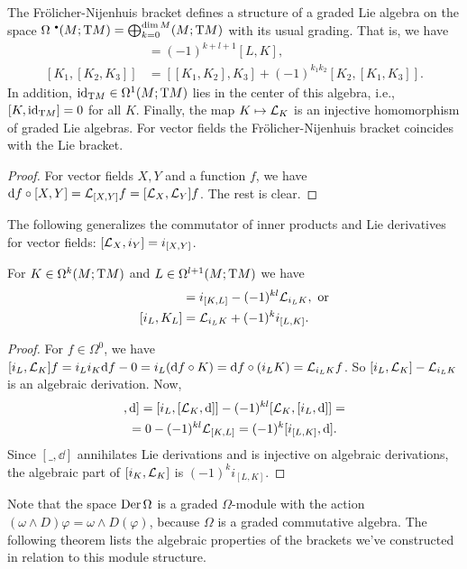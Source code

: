 \begin{thm}
    The Fr\"olicher-Nijenhuis bracket defines a structure of a graded Lie algebra on the space $\Omega^{\smbullet}(M;\T M)=\bigoplus_{k=0}^{\dim M}(M;\T M)$ with its usual grading. That is, we have 
    \begin{align}
        [K,L]&=(-1)^{k+l+1}[L,K],\\
        [K_1,[K_2,K_3]]&=[[K_1,K_2],K_3]+(-1)^{k_1k_2}[K_2,[K_1,K_3]].
    \end{align}
    In addition, $\operatorname{id}_{\mathrm{T} M}\in\Omega^1(M;\mathrm{T} M)$ lies in the center of this algebra, i.e., $[K,\operatorname{id}_{\mathrm{T} M}]=0$ for all $K$. Finally, the map $K\mapsto \mathcal{L}_K$ is an injective homomorphism of graded Lie algebras. For vector fields the Fr\"olicher-Nijenhuis bracket coincides with the Lie bracket.
\end{thm}
\begin{proof}
    For vector fields $X,Y$ and a function $f$, we have ${\mathrm{d}} f\circ [X,Y]=\mathcal{L}_{[X,Y]}f=[\mathcal{L}_X,\mathcal{L}_Y]f$. The rest is clear.
\end{proof}

The following generalizes the commutator of inner products and Lie derivatives for vector fields: $[\mathcal{L}_X,i_Y]=i_{[X,Y]}$.
\begin{lem}\label{lem 8.6 Kolar}
    For $K\in\Omega^k(M;\mathrm{T} M)$ and $L\in\Omega^{l+1}(M;\mathrm{T} M)$ we have 
    \begin{align}
        [\Lie_K,i_L]&=i_{[K,L]}-(-1)^{kl}\Lie_{i_L K}, \text{ or}\\
        [i_L,K_L]&=\Lie_{i_L K}+(-1)^ki_{[L,K]}.
    \end{align}
\end{lem}
\begin{proof}
    For $f\in\Omega^0$, we have $[i_L,\mathcal{L}_K]f=i_Li_K{\mathrm{d}} f-0=i_L({\mathrm{d}} f\circ K)={\mathrm{d}} f\circ (i_L K)=\mathcal{L}_{i_L K} f$. So $[i_L,\mathcal{L}_K]-\mathcal{L}_{i_L K}$ is an algebraic derivation. Now, 
    \begin{multline}
        [[i_L,\Lie_K],\dd]=[i_L,[\Lie_K,\dd]]-(-1)^{kl}[\Lie_K,[i_L,\dd]]=\\
        =0-(-1)^{kl}\Lie_{[K,L]}=(-1)^k[i_{[L,K]},\dd].
    \end{multline}
    Since $[\_,\dd]$ annihilates Lie derivations and is injective on algebraic derivations, the algebraic part of $[i_K,\mathcal{L}_K]$ is $(-1)^k i_{[L,K]}$.
\end{proof}


Note that the space $\operatorname{Der} \Omega$ is a graded $\Omega$-module with the action $(\omega\wedge D)\varphi=\omega\wedge D(\varphi)$, because $\Omega$ is a graded commutative algebra. The following theorem lists the algebraic properties of the brackets we've constructed in relation to this module structure.

